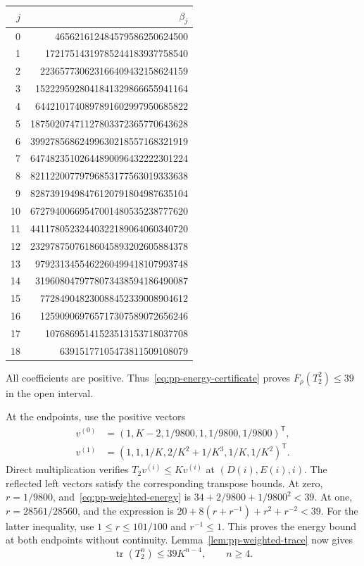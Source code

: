\documentclass[11pt,a4paper]{article}
\theoremstyle{definition}
\theoremstyle{remark}
\newcommand{\T}{\mathsf{T}}
\begin{document}
\begin{center}\small
\begin{longtable}{r r}
\toprule
$j$ & $\beta_j$\\
\midrule
0 & 465621612484579586250624500\\
1 & 17217514319785244183937758540\\
2 & 223657730623166409432158624159\\
3 & 1522295928041841329866655941164\\
4 & 6442101740897891602997950685822\\
5 & 18750207471127803372365770643628\\
6 & 39927856862499630218557168321919\\
7 & 64748235102644890096432222301224\\
8 & 82112200779796853177563019333638\\
9 & 82873919498476120791804987635104\\
10 & 67279400669547001480535238777620\\
11 & 44117805232440322189064060340720\\
12 & 23297875076186045893202605884378\\
13 & 9792313455462260499418107993748\\
14 & 3196080479778073438594186490087\\
15 & 772849048230088452339008904612\\
16 & 125909069765717307589072656246\\
17 & 10768695141523513153718037708\\
18 & 63915177105473811509108079\\
\bottomrule
\end{longtable}
\end{center}
All coefficients are positive.
Thus~\eqref{eq:pp-energy-certificate} proves $F_\rho(T_2^2)\le39$ in the open interval.

At the endpoints, use the positive vectors
\[
\begin{aligned}
v^{(0)}&=(1,K-2,1/9800,1,1/9800,1/9800)^\T,\\
v^{(1)}&=(1,1,1/K,2/K^2+1/K^3,1/K,1/K^2)^\T.
\end{aligned}
\]
Direct multiplication verifies $T_2v^{(i)}\le Kv^{(i)}$ at $(D(i),E(i),i)$.
The reflected left vectors satisfy the corresponding transpose bounds.
At zero, $r=1/9800$, and~\eqref{eq:pp-weighted-energy} is
$34+2/9800+1/9800^2<39$.
At one, $r=28561/28560$, and the expression is
$20+8(r+r^{-1})+r^2+r^{-2}<39$.
For the latter inequality, use $1\le r\le101/100$ and $r^{-1}\le1$.
This proves the energy bound at both endpoints without continuity.
Lemma~\ref{lem:pp-weighted-trace} now gives
\begin{equation}\label{eq:pp-six-trace}
\operatorname{tr}(T_2^n)\le39K^{n-4},\qquad n\ge4.
\end{equation}
\end{document}

